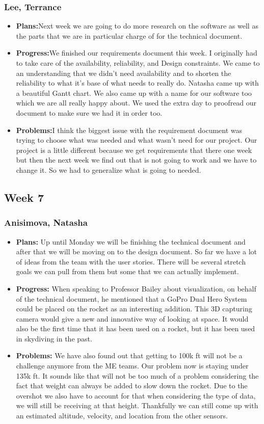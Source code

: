 \documentclass[10pt,draftclsnofoot,onecolumn]{IEEEtran}
\begin{document}
\subsubsection{Lee, Terrance}
\begin{itemize}
	\item \textbf{Plans:}Next week we are going to do more research on the software as well as the parts that we are in particular charge of for the technical document.
	\item \textbf{Progress:}We finished our requirements document this week. I originally had to take care of the availability, reliability, and Design constraints. We came to an understanding that we didn’t need availability and to shorten the reliability to what it’s base of what needs to really do. Natasha came up with a beautiful Gantt chart. We also came up with a name for our software too which we are all really happy about. We used the extra day to proofread our document to make sure we had it in order too.
	\item \textbf{Problems:}I think the biggest issue with the requirement document was trying to choose what was needed and what wasn’t need for our project. Our project is a little different because we get requirements that there one week but then the next week we find out that is not going to work and we have to change it. So we had to generalize what is going to needed.
\end{itemize}
\subsection{Week 7}
\subsubsection{Anisimova, Natasha}
\begin{itemize}
	\item \textbf{Plans: }
	Up until Monday we will be finishing the technical document and after that we will be moving on to the design document. So far we have a lot of ideas from the team with the user stories. There will be several stretch goals we can pull from them but some that we can actually implement.
	\item \textbf{Progress: }
	When speaking to Professor Bailey about visualization, on behalf of the technical document, he mentioned that a GoPro Dual Hero System could be placed on the rocket as an interesting addition. This 3D capturing camera would give a new and innovative way of looking at space. It would also be the first time that it has been used on a rocket, but it has been used in skydiving in the past. 
	\item \textbf{Problems: }
	We have also found out that getting to 100k ft will not be a challenge anymore from the ME teams. Our problem now is staying under 135k ft. It sounds like that will not be too much of a problem considering the fact that weight can always be added to slow down the rocket. Due to the overshot we also have to account for that when considering the type of data, we will still be receiving at that height. Thankfully we can still come up with an estimated altitude, velocity, and location from the other sensors.
\end{itemize}
\end{document}
